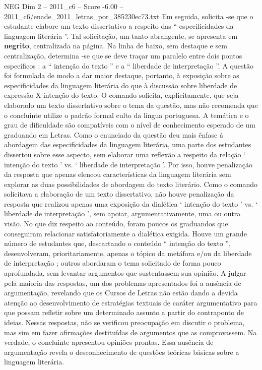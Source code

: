 \begin{textsample}{NEG Dim 2 – 2011\_c6 – Score -6.00 – 2011\_c6/enade\_2011\_letras\_por\_385230ec73.txt}
Em seguida, solicita -se que o estudante elabore um texto dissertativo a respeito das “ especificidades da linguagem literária ”.
Tal solicitação, um tanto abrangente, se apresenta em \textbf{negrito}, centralizada na página.
Na linha de baixo, sem destaque e sem centralização, determina -se que se deve traçar um paralelo entre dois pontos específicos : a “ intenção do texto ” e a “ liberdade de interpretação ”.
A questão foi formulada de modo a dar maior destaque, portanto, à exposição sobre as especificidades da linguagem literária do que à discussão sobre liberdade de expressão X intenção do texto.
O comando solicita, explicitamente, que seja elaborado um texto dissertativo sobre o tema da questão, mas não recomenda que o concluinte utilize o padrão formal culto da língua portuguesa.
A temática e o grau de dificuldade são compatíveis com o nível de conhecimento esperado de um graduando em Letras.
Como o enunciado da questão deu mais ênfase à abordagem das especificidades da linguagem literária, uma parte dos estudantes dissertou sobre esse aspecto, sem elaborar uma reflexão a respeito da relação ‘ intenção do texto ’ vs. ‘ liberdade de interpretação ’.
Por isso, houve penalização da resposta que apenas elencou características da linguagem literária sem explorar as duas possibilidades de abordagem do texto literário.
Como o comando solicitava a elaboração de um texto dissertativo, não houve penalização da resposta que realizou apenas uma exposição da dialética ‘ intenção do texto ’ vs. ‘ liberdade de interpretação ’, sem apoiar, argumentativamente, uma ou outra visão.
No que diz respeito ao conteúdo, foram poucos os graduandos que conseguiram relacionar satisfatoriamente a dialética exigida.
Houve um grande número de estudantes que, descartando o conteúdo “ intenção do texto ”, desenvolveram, prioritariamente, apenas o tópico da metáfora e/ou da liberdade de interpretação ; outros abordaram o tema solicitado de forma pouco aprofundada, sem levantar argumentos que sustentassem sua opinião.
A julgar pela maioria das respostas, um dos problemas apresentados foi a ausência de argumentação, revelando que os Cursos de Letras não estão dando a devida atenção ao desenvolvimento de estratégias textuais de caráter argumentativo para que possam refletir sobre um determinado assunto a partir do contraponto de ideias.
Nessas respostas, não se verificou preocupação em discutir o problema, mas sim em fazer afirmações destituídas de argumentos que as comprovassem.
Na verdade, o concluinte apresentou opiniões prontas.
Essa ausência de argumentação revela o desconhecimento de questões teóricas básicas sobre a linguagem literária.

\end{textsample}
